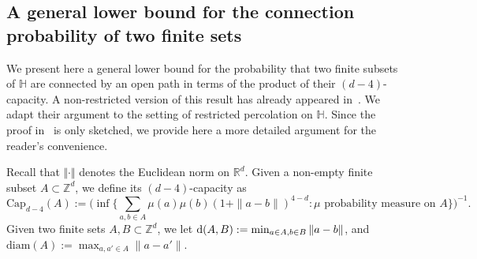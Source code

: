 \documentclass[11pt,a4paper]{article}
\numberwithin{equation}{section}
\theoremstyle{plain}
\theoremstyle{definition}
\begin{document}
\subsection{A general lower bound for the connection probability of two finite sets}\label{sec:lowerbound2sets}
We present here a general lower bound for the probability that two finite subsets of $\mathbb H$ are connected by an open path in terms of the product of their $(d-4)$-capacity. A non-restricted version of this result has already appeared in~\cite{Asselah2025capacity}. We adapt their argument to the setting of restricted percolation on $\mathbb H$. Since the proof in~\cite{Asselah2025capacity} is only sketched, we provide here a more detailed argument for the reader's convenience. 

Recall that $\Vert \cdot \Vert$ denotes the Euclidean norm on $\mathbb R^d$. Given a non-empty finite subset $A\subset \mathbb Z^d$, we define its $(d-4)$-capacity as 
\begin{equation}
\textrm{Cap}_{d-4}(A) := \Big( \inf\Big\{ \sum_{a,b\in A} \mu(a)\mu(b) (1+\|a-b\|)^{4-d} : \mu \textrm{ probability measure on }A\Big\}\Big)^{-1}.
\end{equation} 
Given two finite sets $A,B\subset \mathbb Z^d$, we let ${\textup{d}}(A,B) := \min_{a\in A,b\in B} \|a-b\|$, and $\textrm{diam}(A) := \max_{a,a'\in A} \|a-a'\|$.  
\end{document}
